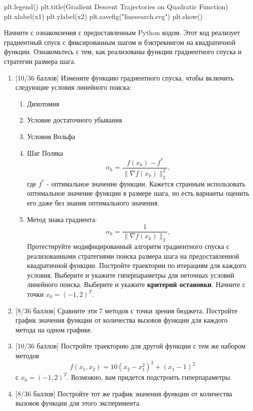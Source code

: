 \documentclass[
  russian,
  letterpaper,
  DIV=11,
  numbers=noendperiod]{scrartcl}
\newenvironment{Shaded}{\begin{snugshade}}{\end{snugshade}}
\newcommand{\NormalTok}[1]{\textcolor[rgb]{0.00,0.23,0.31}{#1}}
\newcommand{\StringTok}[1]{\textcolor[rgb]{0.13,0.47,0.30}{#1}}
\providecommand{\tightlist}{%
  \setlength{\itemsep}{0pt}\setlength{\parskip}{0pt}}
\begin{document}
\begin{enumerate}
\begin{Shaded}
\begin{Highlighting}[]
\NormalTok{plt.legend()}
\NormalTok{plt.title(}\StringTok{\textquotesingle{}Gradient Descent Trajectories on Quadratic Function\textquotesingle{}}\NormalTok{)}
\NormalTok{plt.xlabel(}\StringTok{\textquotesingle{}x1\textquotesingle{}}\NormalTok{)}
\NormalTok{plt.ylabel(}\StringTok{\textquotesingle{}x2\textquotesingle{}}\NormalTok{)}
\NormalTok{plt.savefig(}\StringTok{"linesearch.svg"}\NormalTok{)}
\NormalTok{plt.show()}
\end{Highlighting}
\end{Shaded}

  Начните с ознакомления с предоставленным Python кодом. Этот код
  реализует градиентный спуск с фиксированным шагом и бэктрекингом на
  квадратичной функции. Ознакомьтесь с тем, как реализованы функции
  градиентного спуска и стратегии размера шага.

  \begin{enumerate}
  \def\labelenumii{\arabic{enumii}.}
  \item
    {[}10/36 баллов{]} Измените функцию градиентного спуска, чтобы
    включить следующие условия линейного поиска:

    \begin{enumerate}
    \def\labelenumiii{\arabic{enumiii}.}
    \tightlist
    \item
      Дихотомия
    \item
      Условие достаточного убывания
    \item
      Условия Вольфа
    \item
      Шаг Поляка \[
       \alpha_k = \frac{f(x_k) - f^*}{\|\nabla f(x_k)\|_2^2},
       \] где \(f^*\) - оптимальное значение функции. Кажется странным
      использовать оптимальное значение функции в размере шага, но есть
      варианты оценить его даже без знания оптимального значения.\\
    \item
      Метод знака градиента: \[
       \alpha_k = \frac{1}{\|\nabla f(x_k)\|_2},
       \] Протестируйте модифицированный алгоритм градиентного спуска с
      реализованными стратегиями поиска размера шага на предоставленной
      квадратичной функции. Постройте траектории по итерациям для
      каждого условия. Выберите и укажите гиперпараметры для неточных
      условий линейного поиска. Выберите и укажите \textbf{критерий
      остановки}. Начните с точки \(x_0 = (-1, 2)^T\).
    \end{enumerate}
  \item
    {[}8/36 баллов{]} Сравните эти 7 методов с точки зрения бюджета.
    Постройте график значения функции от количества вызовов функции для
    каждого метода на одном графике.
  \item
    {[}10/36 баллов{]} Постройте траекторию для другой функции с тем же
    набором методов \[
     f(x_1, x_2) =  10(x_2 − x_1^2)^2 + (x_1 − 1)^2
     \] с \(x_0 = (-1, 2)^T\). Возможно, вам придется подстроить
    гиперпараметры.
  \item
    {[}8/36 баллов{]} Постройте тот же график значения функции от
    количества вызовов функции для этого эксперимента.
  \end{enumerate}
\end{enumerate}
\end{document}
